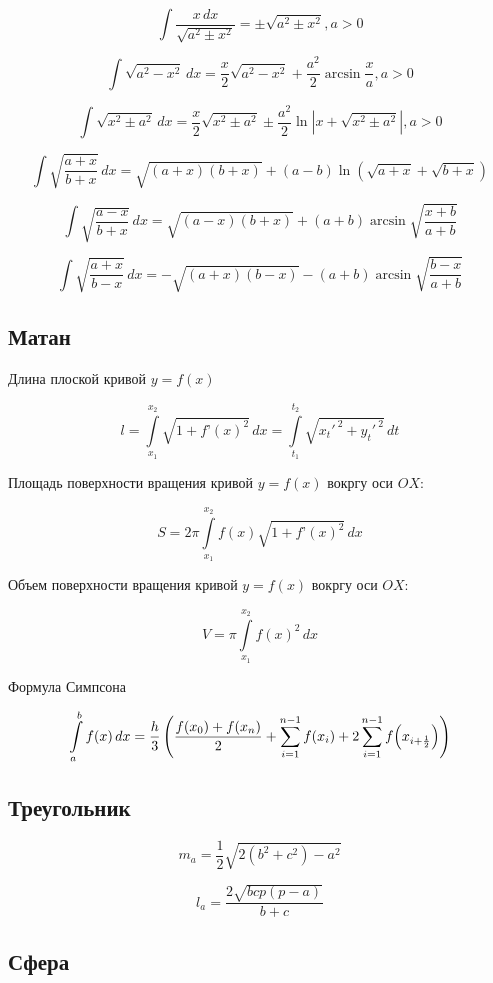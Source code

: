 \documentclass[14pt,a4paper,oneside]{article}
\begin{document}
\[
\int \frac{x\,dx} {\sqrt{a^2 \pm x^2}} = \pm \sqrt{a^2 \pm x^2} , a > 0
\]

\[
\int {\sqrt{a^2 - x^2}}\,dx = \frac x 2 \sqrt{a^2 - x^2} + \frac {a^2} 2 \arcsin{\frac x a}, a > 0
\]

\[
\int {\sqrt{x^2 \pm a^2}}\,dx = \frac x 2 \sqrt{x^2 \pm a^2} \pm \frac {a^2} 2 \ln{|x + \sqrt{x^2 \pm a^2}|}, a > 0
\]

\[
\int {\sqrt{\frac{a + x}{b + x}}}\,dx = \sqrt{(a + x)(b + x)} + (a - b)\ln{(\sqrt{a + x} + \sqrt{b + x})}
\]

\[
\int {\sqrt{\frac{a - x}{b + x}}}\,dx = \sqrt{(a - x)(b + x)} + (a + b)\arcsin{\sqrt{\frac{x + b}{a + b}}}
\]

\[
\int {\sqrt{\frac{a + x}{b - x}}}\,dx = -\sqrt{(a + x)(b - x)} - (a + b)\arcsin{\sqrt{\frac{b - x}{a + b}}}
\]

\subsection{Матан}

\hspace*{1.3em}Длина плоской кривой $y = f(x)$

\[
l = \int\limits_{x_1}^{x_2} \sqrt{1 + f’(x)^2} \,dx = \int\limits_{t_1}^{t_2} \sqrt{x_t'^{~2} + y_t'^{~2}} \,dt
\]

Площадь поверхности вращения кривой $y = f(x)$ вокргу оси $OX$:

\[
S = 2\pi \int\limits_{x_1}^{x_2} f(x)\sqrt{1 + f’(x)^2} \,dx
\]

Объем поверхности вращения кривой $y = f(x)$ вокргу оси $OX$:

\[
V = \pi \int\limits_{x_1}^{x_2} f(x)^2 \,dx
\]

Формула Симпсона

\[
\int\limits_a^b f(x) \,dx = {\frac h 3}\left({\frac{f(x_0) + f(x_n)} 2} + \sum_{i=1}^{n-1} f(x_i) + 2 \sum_{i=1}^{n-1} f\Bigl(x_{i+ \frac 1 2}\Bigr) \right)
\]

\subsection{Треугольник}

\[
m_a = \frac 1 2 \sqrt{2(b^2+c^2) - a^2}
\]

\[
l_a = \frac {2\sqrt{bcp(p-a)}} {b + c}
\]

\subsection{Сфера}
\end{document}
